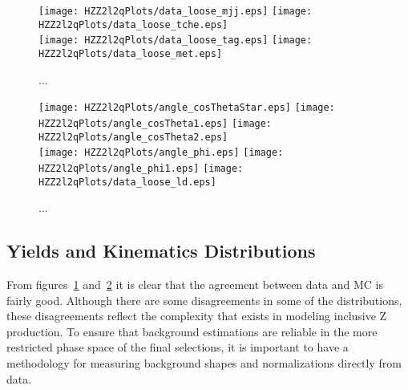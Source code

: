 \begin{figure}
\begin{center}
\texttt{[image: HZZ2l2qPlots/data\_loose\_mjj.eps]}
\texttt{[image: HZZ2l2qPlots/data\_loose\_tche.eps]}\\
\texttt{[image: HZZ2l2qPlots/data\_loose\_tag.eps]}
\texttt{[image: HZZ2l2qPlots/data\_loose\_met.eps]}
\caption{ ... }
\label{fig:HZZ2l2qPreselectiOnly}
\end{center}
\end{figure}

\begin{figure}
\begin{center}
\texttt{[image: HZZ2l2qPlots/angle\_cosThetaStar.eps]}
\texttt{[image: HZZ2l2qPlots/angle\_cosTheta1.eps]}
\texttt{[image: HZZ2l2qPlots/angle\_cosTheta2.eps]}\\
\texttt{[image: HZZ2l2qPlots/angle\_phi.eps]}
\texttt{[image: HZZ2l2qPlots/angle\_phi1.eps]}
\texttt{[image: HZZ2l2qPlots/data\_loose\_ld.eps]}
\caption{ ... }
\label{fig:HZZ2l2qAngularLD}
\end{center}
\end{figure}

\subsection{Yields and Kinematics Distributions}
\label{sec:HZZ2l2qyields}

From figures~\ref{fig:HZZ2l2qPreselectiOnly} and~\ref{fig:HZZ2l2qAngularLD}
it is clear that the agreement between data and MC is fairly good.  
Although there are some disagreements in some of the distributions,
these disagreements reflect the complexity that exists in modeling
inclusive Z production.  To ensure that background estimations are
reliable in the more restricted phase space of the final selections,
it is important to have a methodology for measuring background 
shapes and normalizations directly from data.

